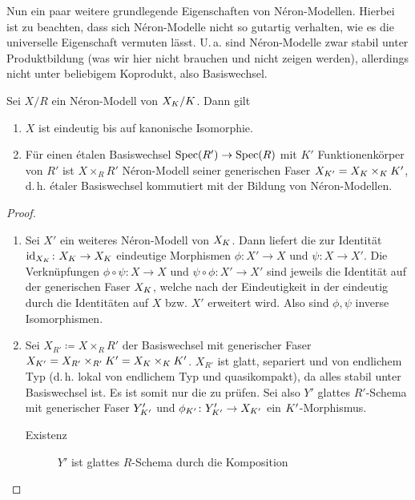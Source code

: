 \documentclass[german, bibliography=totoc]{scrreprt}
\renewcommand*{\optcite}[2][]{}
\begin{document}
Nun ein paar weitere grundlegende Eigenschaften von Néron-Modellen.
Hierbei ist zu beachten, dass sich Néron-Modelle nicht so gutartig
verhalten, wie es die universelle Eigenschaft vermuten lässt.
U.\,a. sind Néron-Modelle zwar stabil unter Produktbildung (was wir
hier nicht brauchen und nicht zeigen werden), allerdings nicht unter
beliebigem Koprodukt, also Basiswechsel.
\begin{Satz}
  \optcite[1.2, Proposition 2]{neron}
  \optcite[Proposition IV.5.2]{silverman2}
  Sei $X/R$ ein Néron-Modell von $X_{K}/K$. Dann gilt
  \begin{enumerate}[label=(\roman*)]
  \item $X$ ist eindeutig bis auf kanonische Isomorphie.
  \item Für einen étalen Basiswechsel $\operatorname{Spec}(R')\to\operatorname{Spec}(R)$ mit $K'$
    Funktionenkörper von $R'$ ist $X\times_R R'$ Néron-Modell
    seiner generischen Faser $X_{K'}=X_{K}\times_{K}K'$,
    d.\,h. étaler Basiswechsel kommutiert mit der Bildung von
    Néron-Modellen.
  \end{enumerate}
  \begin{proof}
    \begin{enumerate}[label=(\roman*)]
    \item Sei $X'$ ein weiteres Néron-Modell von $X_{K}$.
      Dann liefert die \NAbbEig zur Identität
      $\mathrm{id}_{X_{K}}\colon X_{K}\to X_{K}$ eindeutige Morphismen
      $\phi\colon X'\to X$ und $\psi\colon X\to X'$.
      Die Verknüpfungen $\phi\circ\psi\colon X\to X$ und
      $\psi\circ\phi\colon X'\to X'$ sind jeweils die Identität auf
      der generischen Faser $X_{K}$, welche nach der Eindeutigkeit in der
      \NAbbEig eindeutig durch die Identitäten auf
      $X$ bzw. $X'$ erweitert wird. Also sind $\phi,\psi$ inverse
      Isomorphismen.
    \item
      Sei $X_{R'}\coloneqq X\times_R R'$ der Basiswechsel
      mit generischer Faser
      $X_{K'}=X_{R'}\times_{R'}K'=X_{K}\times_{K}K'$.
      $X_{R'}$ ist glatt, separiert und von endlichem Typ 
      (d.\,h. lokal von endlichem Typ und quasikompakt), da alles
      stabil unter Basiswechsel ist. Es ist somit nur die
      \NAbbEig zu prüfen.
      Sei also $Y'$ glattes $R'$-Schema mit generischer Faser
      $Y_{K'}'$ und $\phi_{K'}\colon Y_{K'}'\to X_{K'}$ ein
      $K'$-Morphismus. 
      \begin{description}
      \item[Existenz] 
        $Y'$ ist glattes $R$-Schema durch die Komposition

\end{description}
\end{enumerate}
\end{proof}
\end{Satz}
\end{document}
